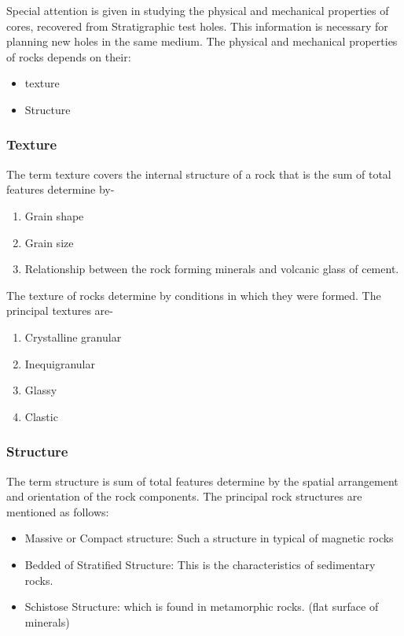 \documentclass{article}
\begin{document}
\begin{multicols}{2}
  Special attention is given in studying the physical and mechanical properties of cores, recovered from Stratigraphic test holes. This information is necessary for planning new holes in the same medium. The physical and mechanical properties of rocks depends on their:
  \begin{itemize}
    \item texture
    \item Structure 
  \end{itemize}

  \subsubsection*{Texture}
  The term texture covers the internal structure of a rock that is the sum of total features determine by- 
  \begin{enumerate}
    \item Grain shape
    \item Grain size 
    \item Relationship between the rock forming minerals and volcanic glass of cement.
  \end{enumerate}

  The texture of rocks determine by conditions in which they were formed. The principal textures are- 
  \begin{enumerate}
    \item Crystalline granular 
    \item Inequigranular
    \item Glassy
    \item Clastic
  \end{enumerate}

  \subsubsection*{Structure}
  The term structure is sum of total features determine by the spatial arrangement and orientation of the rock components. The principal rock structures are mentioned as follows:
  \begin{itemize}
    \item Massive or Compact structure: Such a structure in typical of magnetic rocks 
    \item Bedded of Stratified Structure: This is the characteristics of sedimentary rocks. 
    \item Schistose Structure: which is found in metamorphic rocks. (flat surface of minerals)
  \end{itemize}


\end{multicols}
\end{document}
